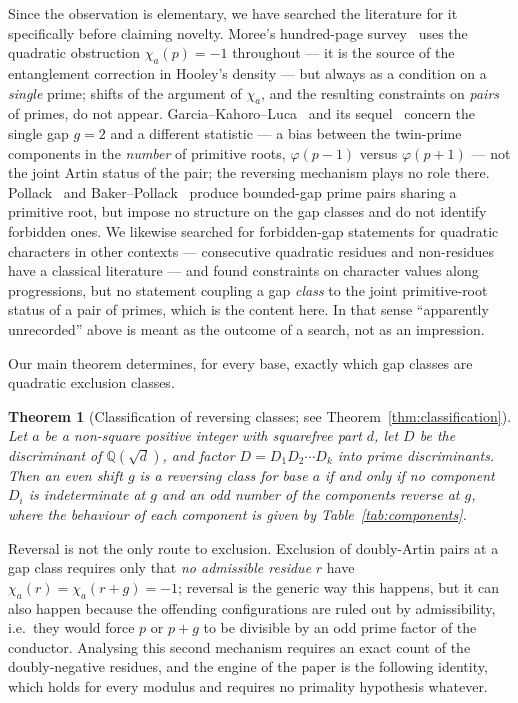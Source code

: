 \documentclass[11pt,reqno]{amsart}
\theoremstyle{plain}
\newtheorem{theorem}{Theorem}
\theoremstyle{definition}
\newcommand{\Q}{\mathbb{Q}}
\begin{document}
Since the observation is elementary, we have searched the literature for it
specifically before claiming novelty. Moree's hundred-page
survey~\cite{Moree2012} uses the quadratic obstruction $\chi_a(p) = -1$
throughout --- it is the source of the entanglement correction in Hooley's
density --- but always as a condition on a \emph{single} prime; shifts of the
argument of $\chi_a$, and the resulting constraints on \emph{pairs} of primes,
do not appear. Garcia--Kahoro--Luca~\cite{GarciaKahoroLuca2019} and its
sequel~\cite{GarciaLucaShiUdell2020} concern the single gap $g = 2$ and a
different statistic --- a bias between the twin-prime components in the
\emph{number} of primitive roots, $\varphi(p-1)$ versus $\varphi(p+1)$ --- not
the joint Artin status of the pair; the reversing mechanism plays no role
there. Pollack~\cite{Pollack2014} and Baker--Pollack~\cite{BakerPollack2016}
produce bounded-gap prime pairs sharing a primitive root, but impose no
structure on the gap classes and do not identify forbidden ones. We likewise
searched for forbidden-gap statements for quadratic characters in other
contexts --- consecutive quadratic residues and non-residues have a classical
literature --- and found constraints on character values along progressions,
but no statement coupling a gap \emph{class} to the joint primitive-root
status of a pair of primes, which is the content here. In that sense
``apparently unrecorded'' above is meant as the outcome of a search, not as an
impression.

Our main theorem determines, for every base, exactly which gap classes are
quadratic exclusion classes.

\begin{theorem}[Classification of reversing classes; see
Theorem~\ref{thm:classification}]
Let $a$ be a non-square positive integer with squarefree part $d$, let $D$ be
the discriminant of $\Q(\sqrt{d})$, and factor $D = D_1 D_2 \cdots D_k$ into
prime discriminants. Then an even shift $g$ is a reversing class for base $a$
if and only if no component $D_i$ is \emph{indeterminate} at $g$ and an odd
number of the components \emph{reverse} at $g$, where the behaviour of each
component is given by Table~\ref{tab:components}.
\end{theorem}

Reversal is not the only route to exclusion. Exclusion of doubly-Artin pairs
at a gap class requires only that \emph{no admissible residue} $r$ have
$\chi_a(r) = \chi_a(r+g) = -1$; reversal is the generic way this happens, but
it can also happen because the offending configurations are ruled out by
admissibility, i.e.\ they would force $p$ or $p+g$ to be divisible by an odd
prime factor of the conductor. Analysing this second mechanism requires an
exact count of the doubly-negative residues, and the engine of the paper is
the following identity, which holds for every modulus and requires no
primality hypothesis whatever.
\end{document}
